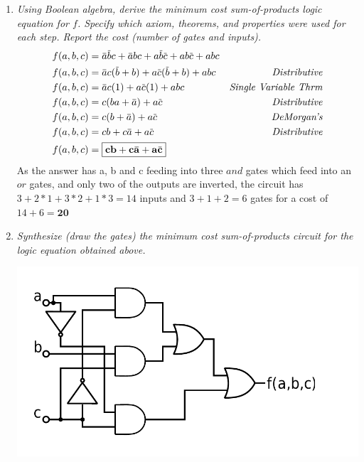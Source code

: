 \documentclass[12pt]{article}
\newcommand{\overbar}[1]{\mkern 1.5mu\overline{\mkern-1.5mu#1\mkern-1.5mu}\mkern 1.5mu}
\begin{document}
\begin{enumerate}
\begin{enumerate}
    	\item \textit{Using Boolean algebra, derive the minimum cost sum-of-products logic equation for $f$. Specify which axiom, theorems, and properties were used for each step. Report the cost (number of gates and inputs).}
		\begin{align*}
        	f(a,b,c) &= \overbar{a}\overbar{b}c + \overbar{a}bc + a\overbar{b}\overbar{c} + ab\overbar{c} + abc \\
            f(a,b,c) &= \overbar{a}c(\overbar{b}+b) + a\overbar{c}(\overbar{b}+b) + abc & \textit{Distributive} \\
            f(a,b,c) &= \overbar{a}c(1) + a\overbar{c}(1) + abc & \textit{Single Variable Thrm} \\
            f(a,b,c) &= c(ba+\overbar{a}) + a\overbar{c} & \textit{Distributive} \\
            f(a,b,c) &= c(b+\overbar{a}) + a\overbar{c} & \textit{DeMorgan's} \\
            f(a,b,c) &= cb + c\overbar{a} + a\overbar{c} & \textit{Distributive} \\
            f(a,b,c) &= \boxed{\mathbf{cb + c\overbar{a} + a\overbar{c}}} \\
        \end{align*}
        As the answer has a, b and c feeding into three $and$ gates which feed into an $or$ gates, and only two of the outputs are inverted, the circuit has $3+2*1+3*2+1*3=14$ inputs and $3+1+2=6$ gates for a cost of $14+6=\boxed{\textbf{20}}$ \\
        
        \newpage
    	\item \textit{Synthesize (draw the gates) the minimum cost sum-of-products circuit for the logic equation obtained above.}
		\begin{center}
			\includegraphics[scale=0.5]{circuit1.pdf}
		\end{center}
    	\end{enumerate} 
    

\end{enumerate}
\end{document}
